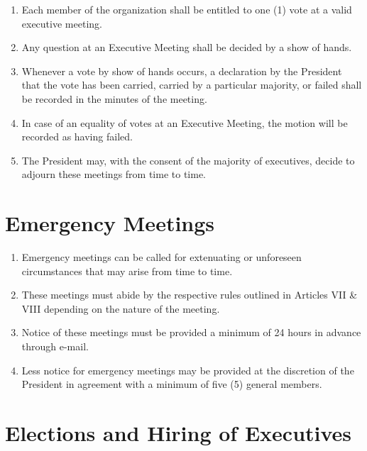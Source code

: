 \documentclass[12pt,a4paper]{article}
\begin{document}
\begin{enumerate}
\item Each member of the organization shall be entitled to one (1) vote at a valid executive meeting.

\item Any question at an Executive Meeting shall be decided by a show of hands.

\item Whenever a vote by show of hands occurs, a declaration by the President that the vote has been carried, carried by a particular majority, or failed shall be recorded in the minutes of the meeting.

\item In case of an equality of votes at an Executive Meeting, the motion will be recorded as having failed.

\item The President may, with the consent of the majority of executives, decide to adjourn these meetings from time to time.
\end{enumerate}

\section{Emergency Meetings}

\begin{enumerate}
\item Emergency meetings can be called for extenuating or unforeseen circumstances that may arise from time to time.

\item These meetings must abide by the respective rules outlined in Articles VII \& VIII depending on the nature of the meeting.

\item Notice of these meetings must be provided a minimum of 24 hours in advance through e-mail.

\item Less notice for emergency meetings may be provided at the discretion of the President in agreement with a minimum of five (5) general members.
\end{enumerate}

\section{Elections and Hiring of Executives}
\end{document}
